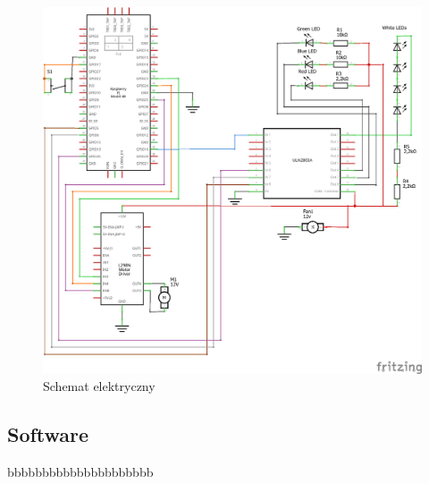 \begin{figure}[H]
    \centering
    \includegraphics[width=0.95\linewidth]{chapters/03-praca-wlasna/figures/electronics circut_schem.png}
    \caption{\label{fig:electronics}Schemat elektryczny}
\end{figure}

\subsection{Software}
bbbbbbbbbbbbbbbbbbbbb